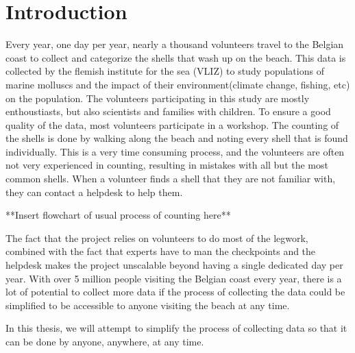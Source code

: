 
\chapter{Introduction}

Every year, one day per year, nearly a thousand volunteers travel to the Belgian coast to collect and categorize the shells that wash up on the beach. This data is collected by the flemish institute for the sea (VLIZ) to study populations of marine molluscs and the impact of their environment(climate change, fishing, etc) on the population. The volunteers participating in this study are mostly enthoustiasts, but also scientists and families with children. To ensure a good quality of the data, most volunteers participate in a workshop. The counting of the shells is done by walking along the beach and noting every shell that is found individually. This is a very time consuming process, and the volunteers are often not very experienced in counting, resulting in mistakes with all but the most common shells. When a volunteer finds a shell that they are not familiar with, they can contact a helpdesk to help them.

**Insert flowchart of usual process of counting here**

The fact that the project relies on volunteers to do most of the legwork, combined with the fact that experts have to man the checkpoints and the helpdesk makes the project unscalable beyond having a single dedicated day per year. With over 5 million people visiting the Belgian coast every year, there is a lot of potential to collect more data if the process of collecting the data could be simplified to be accessible to anyone visiting the beach at any time.

In this thesis, we will attempt to simplify the process of collecting data so that it can be done by anyone, anywhere, at any time.